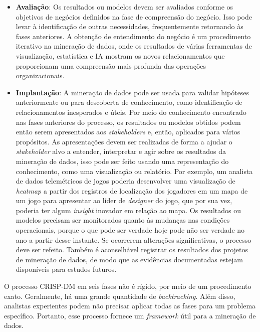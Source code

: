 \begin{itemize}
  \item
\textbf{Avaliação}: Os resultados ou modelos devem ser avaliados conforme os objetivos de negócios definidos na fase de compreensão do negócio. Isso pode levar à identificação de outras necessidades, frequentemente retornando às fases anteriores. A obtenção de entendimento do negócio é um procedimento iterativo na mineração de dados, onde os resultados de várias ferramentas de visualização, estatística e IA mostram os novos relacionamentos que proporcionam uma compreensão mais profunda das operações organizacionais.
  \item
\textbf{Implantação}: A mineração de dados pode ser usada para validar hipóteses anteriormente  ou para descoberta de conhecimento, como identificação de relacionamentos inesperados e úteis. Por meio do conhecimento encontrado nas fases anteriores do processo, os resultados ou modelos obtidos podem então serem apresentados aos \textit{stakeholders} e, então, aplicados para vários propósitos. As apresentações devem ser realizadas de forma a ajudar o \textit{stakeholder} alvo a entender, interpretar e agir sobre os resultados da mineração de dados, isso pode ser feito usando uma representação do conhecimento, como uma visualização ou relatório. Por exemplo, um analista de dados telemétricos de jogos poderia desenvolver uma visualização de \textit{heatmap} a partir dos registros de localização dos jogadores em um mapa de um jogo para apresentar ao líder de \textit{designer} do jogo, que por sua vez, poderia ter algum \textit{insight} inovador em relação ao mapa. Os resultados ou modelos precisam ser monitorados quanto  {\`a}s mudanças nas condições operacionais, porque o que pode ser verdade hoje pode não ser verdade no ano a partir desse instante. Se ocorrerem alterações significativas, o processo deve ser refeito. Também é aconselhável registrar os resultados dos projetos de mineração de dados, de modo que as evidências documentadas estejam disponíveis para estudos futuros.

\end{itemize}
O processo CRISP-DM em seis fases não é rígido, por meio de um procedimento exato. Geralmente, há uma grande quantidade de \textit{backtracking}. Além disso, analistas experientes podem não precisar aplicar todas as fases para um problema específico. Portanto, esse processo fornece um \textit{framework} útil para a mineração de dados.

